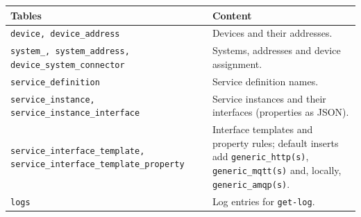 \documentclass[a4paper]{arrowhead}
\begin{document}
\noindent\begin{longtable}{| p{6.4cm} | p{8.8cm} |} \hline
\rowcolor{gray!33} Tables & Content \\ \hline \endhead
\texttt{device,\allowbreak{} device\_\allowbreak{}address} & Devices and their addresses. \\ \hline
\texttt{system\_\allowbreak{},\allowbreak{} system\_\allowbreak{}address,\allowbreak{} device\_\allowbreak{}system\_\allowbreak{}connector} & Systems, addresses and device assignment. \\ \hline
\texttt{service\_\allowbreak{}definition} & Service definition names. \\ \hline
\texttt{service\_\allowbreak{}instance,\allowbreak{} service\_\allowbreak{}instance\_\allowbreak{}interface} & Service instances and their interfaces (properties as JSON). \\ \hline
\texttt{service\_\allowbreak{}interface\_\allowbreak{}template,\allowbreak{} service\_\allowbreak{}interface\_\allowbreak{}template\_\allowbreak{}property} & Interface templates and property rules; default inserts add \texttt{generic\_\allowbreak{}http(s)}, \texttt{generic\_\allowbreak{}mqtt(s)} and, locally, \texttt{generic\_\allowbreak{}amqp(s)}. \\ \hline
\texttt{logs} & Log entries for \texttt{get-\allowbreak{}log}. \\ \hline
\end{longtable}
\end{document}
